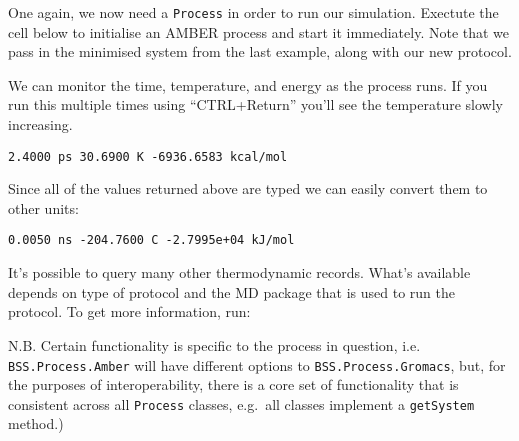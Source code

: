 One again, we now need a \texttt{Process} in order to run our
simulation. Exectute the cell below to initialise an AMBER process and
start it immediately. Note that we pass in the minimised system from the
last example, along with our new protocol.

\begin{Shaded}
\begin{Highlighting}[]
\OperatorTok{=}
\end{Highlighting}
\end{Shaded}

We can monitor the time, temperature, and energy as the process runs. If
you run this multiple times using ``CTRL+Return'' you'll see the
temperature slowly increasing.

\begin{Shaded}
\begin{Highlighting}[]
\end{Highlighting}
\end{Shaded}

\begin{verbatim}
2.4000 ps 30.6900 K -6936.6583 kcal/mol
\end{verbatim}

Since all of the values returned above are typed we can easily convert
them to other units:

\begin{Shaded}
\begin{Highlighting}[]
\end{Highlighting}
\end{Shaded}

\begin{verbatim}
0.0050 ns -204.7600 C -2.7995e+04 kJ/mol
\end{verbatim}

It's possible to query many other thermodynamic records. What's
available depends on type of protocol and the MD package that is used to
run the protocol. To get more information, run:

N.B. Certain functionality is specific to the process in question, i.e.
\texttt{BSS.Process.Amber} will have different options to
\texttt{BSS.Process.Gromacs}, but, for the purposes of interoperability,
there is a core set of functionality that is consistent across all
\texttt{Process} classes, e.g.~all classes implement a
\texttt{getSystem} method.)


